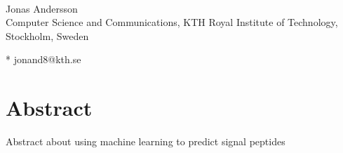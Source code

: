 \documentclass[10pt,letterpaper]{article}
\date{}
\begin{document}
	\vspace*{0.2in}
	
	\begin{flushleft}
		{\Large
			\textbf{} %
		}
		\newline
		\\
		Jonas Andersson
		\\
		\bigskip
		Computer Science and Communications, KTH Royal Institute of Technology, Stockholm, Sweden
		\bigskip
		
		
		
		
		
		
		* jonand8@kth.se
		
	\end{flushleft}
	\section*{Abstract}
	Abstract about using machine learning to predict signal peptides
	
\end{document}
